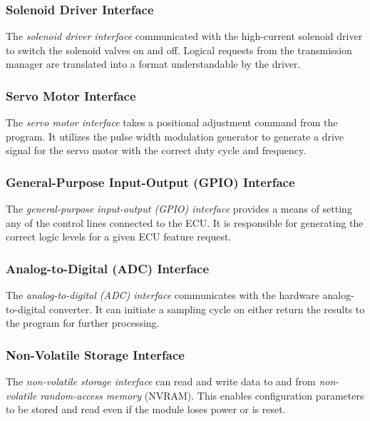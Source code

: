 \subsubsection{Solenoid Driver Interface}

The \emph{solenoid driver interface} communicated with the high-current solenoid driver to switch the solenoid valves on and off. Logical requests from the transmission manager are translated into a format understandable by the driver.

\subsubsection{Servo Motor Interface}

The \emph{servo motor interface} takes a positional adjustment command from the program. It utilizes the pulse width modulation generator to generate a drive signal for the servo motor with the correct duty cycle and frequency.

\subsubsection{General-Purpose Input-Output (GPIO) Interface}
\label{sec:design_engine_gpio}

The \emph{general-purpose input-output (GPIO) interface} provides a means of setting any of the control lines connected to the ECU. It is responsible for generating the correct logic levels for a given ECU feature request.

\subsubsection{Analog-to-Digital (ADC) Interface} 
\label{sec:design_engine_adc}

The \emph{analog-to-digital (ADC) interface} communicates with the hardware analog-to-digital converter. It can initiate a sampling cycle on either return the results to the program for further processing.

\subsubsection{Non-Volatile Storage Interface}
\label{sec:design_engine_nvsi}

The \emph{non-volatile storage interface} can read and write data to and from \emph{non-volatile random-access memory} (NVRAM). This enables configuration parameters to be stored and read even if the module loses power or is reset.
